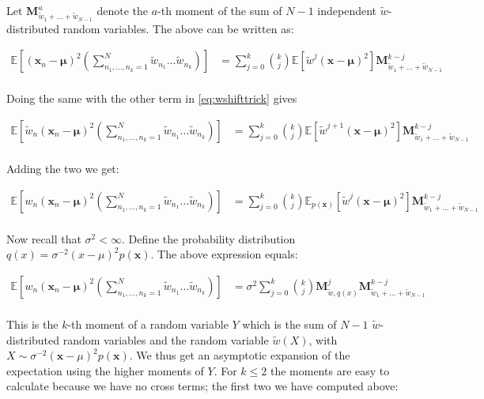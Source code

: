 \documentclass[10pt,english]{article}
\newcommand{\E}{\mathbb{E}}
\newcommand{\M}{\mathbold{M}}
\newcommand{\mathbold}[1]{\ensuremath{\boldsymbol{\mathbf{#1}}}}
\newcommand{\bx}{\mathbold{x}}
\newcommand{\bmu}{\mathbold{\mu}}
\newcommand{\px}{{p(\bx)}}
\begin{document}
Let $\M_{\tilde w_1 + \ldots + \tilde w_{N-1}}^a$ denote the $a$-th moment of the sum of $N-1$ independent $\tilde w$-distributed random variables. The above can be written as:

\begin{align*}
\E\left[(\bx_n - \bmu)^2\left( \sum_{n_1,\ldots,n_k=1}^N \tilde w_{n_1} \ldots \tilde w_{n_k} \right)\right]
&= \sum_{j=0}^k \binom{k}{j} \E\left[ \tilde w^j (\bx - \bmu)^2 \right]\M_{\tilde w_1 + \ldots + \tilde w_{N-1}}^{k-j} \\
\end{align*}

\noindent Doing the same with the other term in \ref{eq:wshifttrick} gives

\begin{align*}
\E\left[\tilde w_n (\bx_n - \bmu)^2\left( \sum_{n_1,\ldots,n_k=1}^N \tilde w_{n_1} \ldots \tilde w_{n_k} \right)\right]
&= \sum_{j=0}^k \binom{k}{j} \E\left[ \tilde w^{j+1} (\bx - \bmu)^2 \right] \M_{\tilde w_1 + \ldots + \tilde w_{N-1}}^{k-j} \\
\end{align*}

\noindent Adding the two we get:

\begin{align*}
\E\left[w_n (\bx_n - \bmu)^2\left( \sum_{n_1,\ldots,n_k=1}^N \tilde w_{n_1} \ldots \tilde w_{n_k} \right)\right]
&= \sum_{j=0}^k \binom{k}{j} \E_\px \left[ \tilde w^j (\bx - \bmu)^2 \right] \M_{\tilde w_1 + \ldots + \tilde w_{N-1}}^{k-j} \\
\end{align*}

\noindent Now recall that $\sigma^2 < \infty$. Define the probability distribution $q(x) = \sigma^{-2} (x - \mu)^2 \px$. The above expression equals:

\begin{align*}
\E\left[w_n (\bx_n - \bmu)^2\left( \sum_{n_1,\ldots,n_k=1}^N \tilde w_{n_1} \ldots \tilde w_{n_k} \right)\right]
&= \sigma^2 \sum_{j=0}^k \binom{k}{j} \M_{\tilde w, q(x)}^j \M_{\tilde w_1 + \ldots + \tilde w_{N-1}}^{k-j} \\
\end{align*}

\noindent This is the $k$-th moment of a random variable $Y$ which is the sum of $N - 1$ $\tilde w$-distributed random variables and the random variable $\tilde w(X)$, with $X \sim \sigma^{-2} (\bx - \mu)^2 \px$. We thus get an asymptotic expansion of the expectation using the higher moments of $Y$. For $k \leq 2$ the moments are easy to calculate because we have no cross terms; the first two we have computed above:
\end{document}
